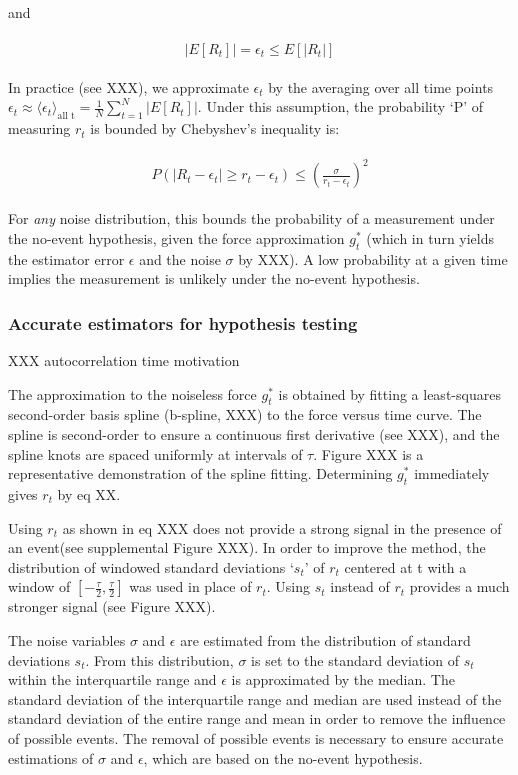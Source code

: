 \documentclass[%
  aip,12pt,tightenlines,
  amsthm,
 amsmath,amssymb
]{article}
\newcommand{\eqs}[1]{
\begin{align*} 
\begin{split}
#1
\end{split}					
\end{align*}}
\newcommand{\pl}[0]{\vspace{6pt}}
\begin{document}
and 

\eqs{ |E[R_t]| = \epsilon_t \le E[|R_t|] }

In practice (see XXX), we approximate $\epsilon_t$ by the averaging over all time points $\epsilon_t \approx \langle \epsilon_t \rangle_{\text{all t}} = \frac{1}{N} \sum_{t=1}^N |E[R_t]|$. Under this assumption, the probability `P' of measuring $r_t$ is bounded by Chebyshev's inequality is:

\eqs{ P( |R_t-\epsilon_t| \ge r_t-\epsilon_t ) \le
 (\frac{\sigma}{r_t-\epsilon_t})^2 }


For \emph{any} noise distribution, this bounds the probability of a measurement under the no-event hypothesis, given the force approximation $g^{*}_t$ (which in turn yields the estimator error $\epsilon$ and the noise $\sigma$ by XXX). A low probability at a given time implies the measurement is unlikely under the no-event hypothesis. \pl

\subsubsection{Accurate estimators for hypothesis testing}

XXX autocorrelation time motivation \pl 

The approximation to the noiseless force $g^{*}_t$ is obtained by fitting a least-squares second-order basis spline (b-spline, XXX) to the force versus time curve. The spline is second-order to ensure a continuous first derivative (see XXX), and the spline knots are spaced uniformly at intervals of $\tau$. Figure XXX is a representative demonstration of the spline fitting. Determining  $g^{*}_t$ immediately gives $r_t$ by eq XX.  \pl

Using $r_t$ as shown in eq XXX does not provide a strong signal in the presence of an event(see supplemental Figure XXX). In order to improve the method, the distribution of windowed standard deviations `$s_t$' of $r_t$ centered at t with a window of $[-\frac{\tau}{2},\frac{\tau}{2}]$ was used in place of $r_t$. Using $s_t$ instead of $r_t$ provides a much stronger signal (see Figure XXX).  \pl

The noise variables $\sigma$ and $\epsilon$ are estimated from the distribution of standard deviations $s_t$. From this distribution, $\sigma$ is set to the standard deviation of $s_t$ within the interquartile range and $\epsilon$ is approximated by the median. The standard deviation of the interquartile range and median are used instead of the standard deviation of the entire range and mean in order to remove the influence of possible events. The removal of possible events is necessary to ensure accurate estimations of $\sigma$ and $\epsilon$, which are based on the no-event hypothesis.
\end{document}

